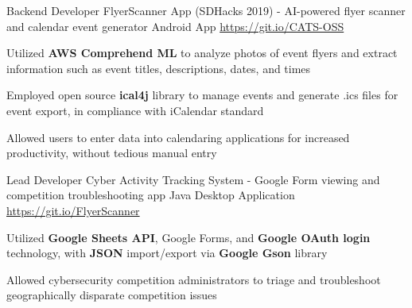 

\begin{cventries}

  \cventry
    {Backend Developer} %
    {FlyerScanner App (SDHacks 2019) - AI-powered flyer scanner and calendar event generator} %
    {Android App} %
    {\href{https://git.io/CATS-OSS}{https://git.io/CATS-OSS}} %
    {
      \begin{cvitems} %
        \item {Utilized \textbf{AWS Comprehend ML} to analyze photos of event flyers and extract information such as event titles, descriptions, dates, and times}
        \item {Employed open source \textbf{ical4j} library to manage events and generate .ics files for event export, in compliance with iCalendar standard}
        \item {Allowed users to enter data into calendaring applications for increased productivity, without tedious manual entry}
      \end{cvitems}
    }

  \cventry
    {Lead Developer} %
    {Cyber Activity Tracking System - Google Form viewing and competition troubleshooting app} %
    {Java Desktop Application} %
    {\href{https://git.io/FlyerScanner}{https://git.io/FlyerScanner}} %
    {
      \begin{cvitems} %
        \item {Utilized \textbf{Google Sheets API}, Google Forms, and \textbf{Google OAuth login} technology, with \textbf{JSON} import/export via \textbf{Google Gson} library}
        \item {Allowed cybersecurity competition administrators to triage and troubleshoot geographically disparate competition issues}
      \end{cvitems}
    }
    
\end{cventries}